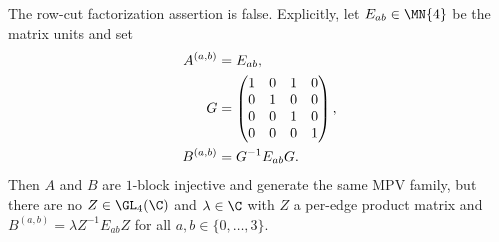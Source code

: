 \begin{lemma}%
    \label{thm:peps_row_cut_gauge_factorizes_false}
    \leanok
    The row-cut factorization assertion is false. Explicitly, let
    $E_{ab}\in\MN{4}$ be the matrix units and set
    \begin{align}
        A^{(a,b)}
         & =E_{ab}, \notag    \\
        G
         & =
        \begin{pmatrix}
            1 & 0 & 1 & 0 \\
            0 & 1 & 0 & 0 \\
            0 & 0 & 1 & 0 \\
            0 & 0 & 0 & 1
        \end{pmatrix}, \notag \\
        B^{(a,b)}
         & =G^{-1}E_{ab}G.
        \notag
    \end{align}
    Then $A$ and $B$ are $1$-block injective and generate the same MPV
    family, but there are no $Z\in\GL_4(\C)$ and $\lambda\in\C$ with
    $Z$ a per-edge product matrix and
    $B^{(a,b)}=\lambda Z^{-1}E_{ab}Z$ for all
    $a,b\in\{0,\ldots,3\}$.
\end{lemma}

